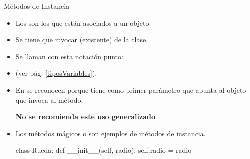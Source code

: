 \documentclass[10pt,envcountsect,spanish]{beamer}
\begin{document}



\begin{frame}[fragile, label={metodoInstancia}]{Métodos de Instancia} 

\begin{itemize}
\item Los  son los que están asociados a un objeto.
\item Se tiene que invocar  (existente) de la clase.
\item Se llaman con esta notación punto: 
\item {} (ver pág. \ref{tiposVariables}).
\item En  se reconocen porque tiene como primer parámetro  que apunta al objeto que invoca al método.

\centerline{\bf No se recomienda este uso generalizado}

\item[] \unEjemplo  

Los métodos mágicos  o  son ejemplos de métodos de instancia.

\begin{pyverbatim}[][frame=single]
class Rueda:
    def __init__(self, radio):
        self.radio = radio
\end{pyverbatim}
\end{itemize}
\end{frame}


\end{document}

